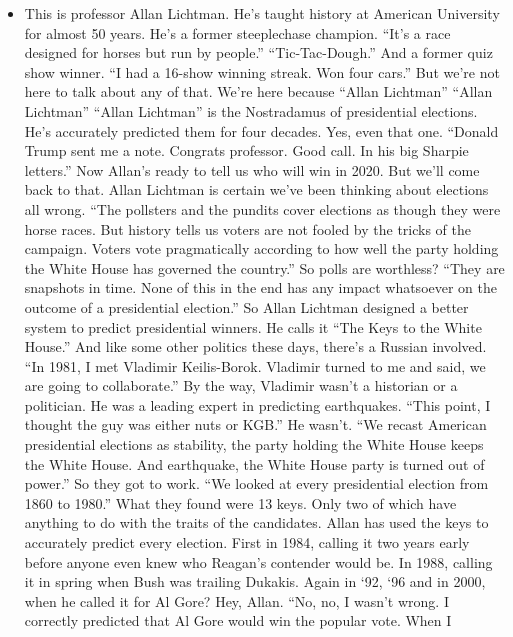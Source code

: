 \begin{itemize}
\tightlist
\item
  This is professor Allan Lichtman. He's taught history at American
  University for almost 50 years. He's a former steeplechase champion.
  ``It's a race designed for horses but run by people.''
  ``Tic-Tac-Dough.'' And a former quiz show winner. ``I had a 16-show
  winning streak. Won four cars.'' But we're not here to talk about any
  of that. We're here because ``Allan Lichtman'' ``Allan Lichtman''
  ``Allan Lichtman'' is the Nostradamus of presidential elections. He's
  accurately predicted them for four decades. Yes, even that one.
  ``Donald Trump sent me a note. Congrats professor. Good call. In his
  big Sharpie letters.'' Now Allan's ready to tell us who will win in
  2020. But we'll come back to that. Allan Lichtman is certain we've
  been thinking about elections all wrong. ``The pollsters and the
  pundits cover elections as though they were horse races. But history
  tells us voters are not fooled by the tricks of the campaign. Voters
  vote pragmatically according to how well the party holding the White
  House has governed the country.'' So polls are worthless? ``They are
  snapshots in time. None of this in the end has any impact whatsoever
  on the outcome of a presidential election.'' So Allan Lichtman
  designed a better system to predict presidential winners. He calls it
  ``The Keys to the White House.'' And like some other politics these
  days, there's a Russian involved. ``In 1981, I met Vladimir
  Keilis-Borok. Vladimir turned to me and said, we are going to
  collaborate.'' By the way, Vladimir wasn't a historian or a
  politician. He was a leading expert in predicting earthquakes. ``This
  point, I thought the guy was either nuts or KGB.'' He wasn't. ``We
  recast American presidential elections as stability, the party holding
  the White House keeps the White House. And earthquake, the White House
  party is turned out of power.'' So they got to work. ``We looked at
  every presidential election from 1860 to 1980.'' What they found were
  13 keys. Only two of which have anything to do with the traits of the
  candidates. Allan has used the keys to accurately predict every
  election. First in 1984, calling it two years early before anyone even
  knew who Reagan's contender would be. In 1988, calling it in spring
  when Bush was trailing Dukakis. Again in `92, `96 and in 2000, when he
  called it for Al Gore? Hey, Allan. ``No, no, I wasn't wrong. I
  correctly predicted that Al Gore would win the popular vote. When I

\end{itemize}
